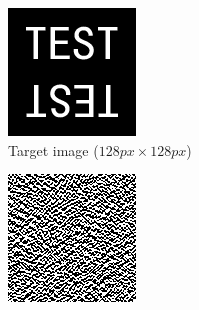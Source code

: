\begin{figure}[H]
  \centering
  \begin{subfigure}[t]{0.3\textwidth}
    \centering
    \includegraphics[width=\textwidth]{test_128.png}
    \caption{Target image ($128 px\times 128 px$)}
    \label{fig:test_128}
  \end{subfigure}
  \hfill
  \begin{subfigure}[t]{0.3\textwidth}
    \centering
    \includegraphics[width=\textwidth]{DBS_test_128_Holo.png}

\end{subfigure}
\end{figure}
